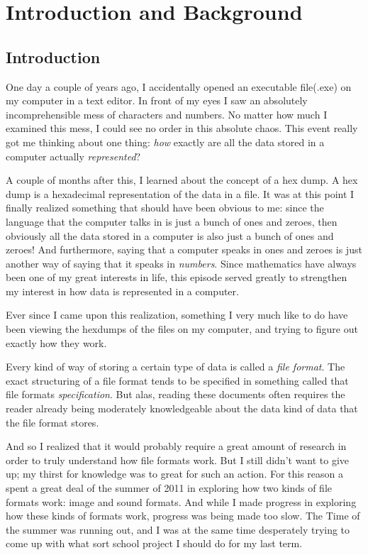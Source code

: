 
\chapter{Introduction and Background}

\section{Introduction}

One day a couple of years ago, I accidentally opened an executable
file(.exe) on my computer in a text editor. In front of my eyes I saw
an absolutely incomprehensible mess of characters and numbers. No
matter how much I examined this mess, I could see no order in this
absolute chaos. This event really got me thinking about one thing:
\textit{how} exactly are all the data stored in a computer actually
\textit{represented}?

A couple of months after this, I learned about the concept of a hex
dump. A hex dump is a hexadecimal representation of the data in a
file. It was at this point I finally realized something that should
have been obvious to me: since the language that the computer talks in
is just a bunch of ones and zeroes, then obviously all the data stored
in a computer is also just a bunch of ones and zeroes! And
furthermore, saying that a computer speaks in ones and zeroes is just
another way of saying that it speaks in \textit{numbers}. Since
mathematics have always been one of my great interests in life, this
episode served greatly to strengthen my interest in how data is
represented in a computer.

Ever since I came upon this realization, something I very much like to
do have been viewing the hexdumps of the files on my computer, and
trying to figure out exactly how they work. %

Every kind of way of storing a certain type of data is called a
\textit{file format}. The exact structuring of a file format tends to
be specified in something called that file formats
\textit{specification}. But alas, reading these documents often
requires the reader already being moderately knowledgeable about the
data kind of data that the file format stores.

And so I realized that it would probably require a great amount of
research in order to truly understand how file formats work. But I
still didn't want to give up; my thirst for knowledge was to great for
such an action.  For this reason a spent a great deal of the summer of
2011 in exploring how two kinds of file formats work: image and sound
formats. And while I made progress in exploring how these kinds of
formats work, progress was being made too slow. The Time of the summer
was running out, and I was at the same time desperately trying to come
up with what sort school project I should do for my last term.

